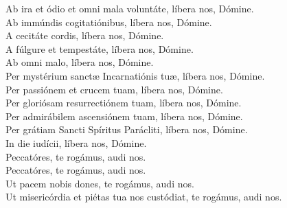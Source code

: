 {	%
	Ab ira et ódio et omni mala voluntáte, líbera nos, Dómine. \\
		Ab immúndis cogitatiónibus, líbera nos, Dómine. \\
		A cecitáte cordis, líbera nos, Dómine. \\
	A fúlgure et tempestáte, líbera nos, Dómine. \\
	Ab omni malo, líbera nos, Dómine. \\
	Per mystérium sanctæ Incarnatiónis tuæ, líbera nos, Dómine. \\
		Per passiónem et crucem tuam, líbera nos, Dómine. \\
		Per gloriósam resurrectiónem tuam, líbera nos, Dómine. \\
	Per admirábilem ascensiónem tuam, líbera nos, Dómine. \\
		Per grátiam Sancti Spíritus Parácliti, líbera nos, Dómine. \\
	In die iudícii, líbera nos, Dómine. \\
	Peccatóres, te rogámus, audi nos. \\
		Peccatóres, te rogámus, audi nos. \\%
		Ut pacem nobis dones, te rogámus, audi nos. \\
		Ut misericórdia et piétas tua nos custódiat, te rogámus, audi nos. \\
}
